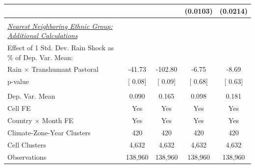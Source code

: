 {\begin{tabular}{l*{4}{c}}
                    &               &               &(0.0103)         &(0.0214)         \\
\midrule
\\ \underline{\emph{Nearest Neighboring Ethnic Group: Additional Calculations}} &               &               &               &               \\
[1em] Effect of 1 Std. Dev. Rain Shock as $\%$ of Dep. Var. Mean:&               &               &               &               \\
[1em] \hspace{15pt} Rain $\times$ Transhumant Pastoral&-41.73         &-102.80         & -6.75         & -8.69         \\
\hspace{15pt} p-value&[     0.08]         &[     0.09]         &[     0.68]         &[     0.63]         \\
\hline \\ Dep. Var. Mean& 0.090         & 0.165         & 0.098         & 0.181         \\
Cell FE             &   Yes         &   Yes         &   Yes         &   Yes         \\
Country $\times$ Month FE&   Yes         &   Yes         &   Yes         &   Yes         \\
Climate-Zone-Year Clusters&   420         &   420         &   420         &   420         \\
Cell Clusters       & 4,632         & 4,632         & 4,632         & 4,632         \\
Observations        &138,960         &138,960         &138,960         &138,960         \\
\bottomrule
\end{tabular}
}
